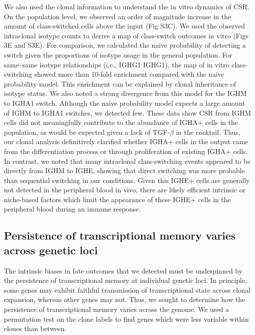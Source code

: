 We also used the clonal information to understand the in vitro dynamics of CSR. On the population level, we observed an order of magnitude increase in the amount of class-switched cells above the input (Fig S3C). We used the observed intraclonal isotype counts to derive a map of class-switch outcomes in vitro (Figs 3E and S3E). For comparison, we calculated the naive probability of detecting a switch given the proportions of isotype usage in the general population. For same–same isotype relationships (i.e., IGHG1 IGHG1), the map of in vitro class-switching showed more than 10-fold enrichment compared with the naive probability model. This enrichment can be explained by clonal inheritance of isotype status. We also noted a strong divergence from this model for the IGHM to IGHA1 switch. Although the naive probability model expects a large amount of IGHM to IGHA1 switches, we detected few. These data show CSR from IGHM cells did not meaningfully contribute to the abundance of IGHA+ cells in the population, as would be expected given a lack of TGF-$\beta$ in the cocktail\cite{stavnezer_surprising_2009}. Thus, our clonal analysis definitively clarified whether IGHA+ cells in the output came from the differentiation process or through proliferation of existing IGHA+ cells. In contrast, we noted that many intraclonal class-switching events appeared to be directly from IGHM to IGHE, showing that direct switching was more probable than sequential switching in our conditions. Given this IGHE+ cells are generally not detected in the peripheral blood in vivo, there are likely efficient intrinsic or niche-based factors which limit the appearance of these IGHE+ cells in the peripheral blood during an immune response.


\subsection{Persistence of transcriptional memory varies across genetic loci}
The intrinsic biases in fate outcomes that we detected must be underpinned by the persistence of transcriptional memory at individual genetic loci. In principle, some genes may exhibit faithful transmission of transcriptional state across clonal expansion, whereas other genes may not. Thus, we sought to determine how the persistence of transcriptional memory varies across the genome. We used a permutation test on the clone labels to find genes which were less variable within clones than between.

